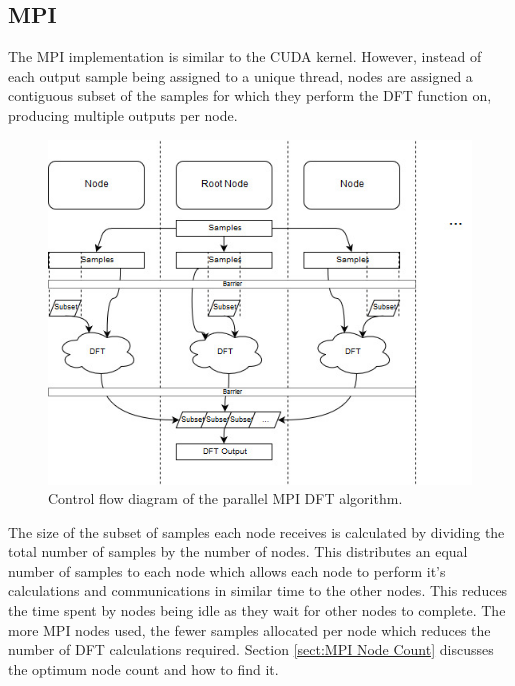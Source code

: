 \documentclass[11pt,a4paper]{article}
\begin{document}
\subsection{MPI}
The MPI implementation is similar to the CUDA kernel. However, instead of each output sample being assigned to a unique thread, nodes are assigned a contiguous subset of the samples for which they perform the DFT function on, producing multiple outputs per node.

\begin{figure}[H]
\begin{center}
\includegraphics[scale=0.5]{mpi_impl1}
\end{center}
\caption{Control flow diagram of the parallel MPI DFT algorithm.}
\label{fig:mpi_impl1}
\end{figure}

The size of the subset of samples each node receives is calculated by dividing the total number of samples by the number of nodes. This distributes an equal number of samples to each node which allows each node to perform it's calculations and communications in similar time to the other nodes. This reduces the time spent by nodes being idle as they wait for other nodes to complete. The more MPI nodes used, the fewer samples allocated per node which reduces the number of DFT calculations required. Section \ref{sect:MPI Node Count} discusses the optimum node count and how to find it.
\end{document}
